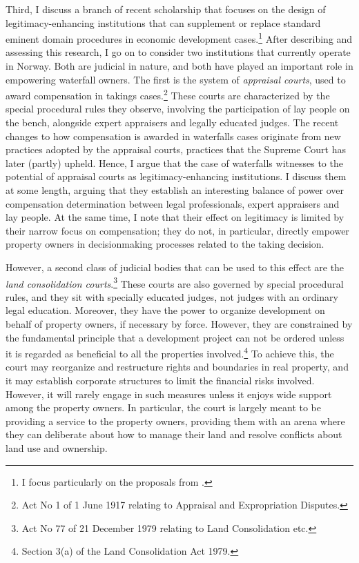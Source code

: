 \documentclass[12pt,a4paper]{article} %
\begin{document}
Third, I discuss a branch of recent scholarship that focuses on the design of legitimacy-enhancing institutions that can supplement or replace standard eminent domain procedures in economic development cases.\footnote{I focus particularly on the proposals from \cite{lehavi07,heller08}.} After describing and assessing this research, I go on to consider two institutions that currently operate in Norway. Both are judicial in nature, and both have played an important role in empowering waterfall owners. The first is the system of {\it appraisal courts}, used to award compensation in takings cases.\footnote{Act No 1 of 1 June 1917 relating to Appraisal and Expropriation Disputes.}  These courts are characterized by the special procedural rules they observe, involving the participation of lay people on the bench, alongside expert appraisers and legally educated judges. The recent changes to how compensation is awarded in waterfalls cases originate from new practices adopted by the appraisal courts, practices that the Supreme Court has later (partly) upheld. Hence, I argue that the case of waterfalls witnesses to the potential of appraisal courts as legitimacy-enhancing institutions. I discuss them at some length, arguing that they establish an interesting balance of power over compensation determination between legal professionals, expert appraisers and lay people. At the same time, I note that their effect on legitimacy is limited by their narrow focus on compensation; they do not, in particular, directly empower property owners in decisionmaking processes related to the taking decision.

However, a second class of judicial bodies that can be used to this effect are the {\it land consolidation courts}.\footnote{Act No 77 of 21 December 1979 relating to Land Consolidation etc.} These courts are also governed by special procedural rules, and they sit with specially educated judges, not judges with an ordinary legal education. Moreover, they have the power to organize development on behalf of property owners, if necessary by force. However, they are constrained by the fundamental principle that a development project can not be ordered unless it is regarded as beneficial to all the properties involved.\footnote{Section 3(a) of the Land Consolidation Act 1979.} To achieve this, the court may reorganize and restructure rights and boundaries in real property, and it may establish corporate structures to limit the financial risks involved. However, it will rarely engage in such measures unless it enjoys wide support among the property owners. In particular, the court is largely meant to be providing a service to the property owners, providing them with an arena where they can deliberate about how to manage their land and resolve conflicts about land use and ownership.
\end{document}

